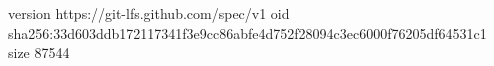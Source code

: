 version https://git-lfs.github.com/spec/v1
oid sha256:33d603ddb172117341f3e9cc86abfe4d752f28094c3ec6000f76205df64531c1
size 87544
